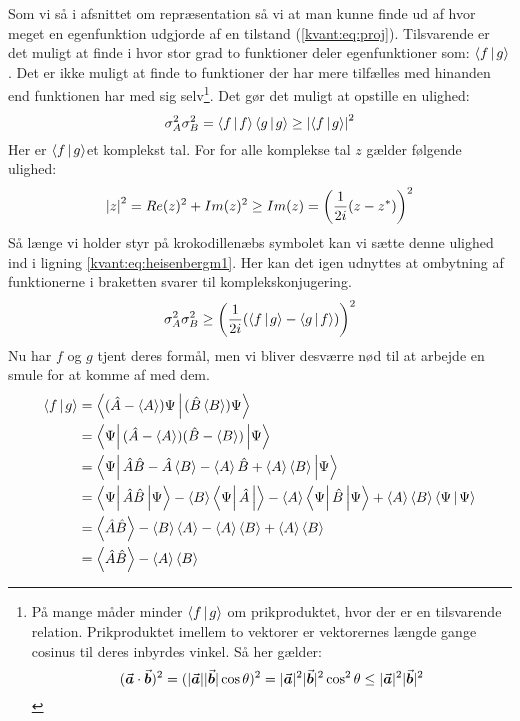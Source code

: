 \documentclass[../Kvantemekanik.tex]{subfiles}
\begin{document}
Som vi så i afsnittet om repræsentation så vi at man kunne finde ud af hvor meget en egenfunktion udgjorde af en tilstand (\eqref{kvant:eq:proj}).
Tilsvarende er det muligt at finde i hvor stor grad to funktioner deler egenfunktioner som: $\braket{f}{g}$. Det er ikke muligt at finde to funktioner der har mere tilfælles med hinanden end funktionen har med sig selv\footnote{
På mange måder minder $\braket{f}{g}$ om prikproduktet, hvor der er en tilsvarende relation. Prikproduktet imellem to vektorer er vektorernes længde gange cosinus til deres inbyrdes vinkel. Så her gælder:
$$
({\vec{\boldsymbol{a}}} \cdot {\vec{\boldsymbol{b}}})^2 = (|{{\vec{\boldsymbol{a}}}}||{{\vec{\boldsymbol{b}}}}|\cos\theta)^2 = |{\vec{\boldsymbol{a}}}|^2|{\vec{\boldsymbol{b}}}|^2\cos^2\theta\leq |{\vec{\boldsymbol{a}}}|^2|{\vec{\boldsymbol{b}}}|^2 
$$
}. Det gør det muligt at opstille en ulighed:
\begin{equation}
    \sigma_A^2\sigma_B^2 =\braket{f}{f}\braket{g}{g}\geq \abs{\braket{f}{g}}^2
    \label{kvant:eq:heisenbergm1}
\end{equation}
Her er $\braket{f}{g}$et komplekst tal. For for alle komplekse tal $z$ gælder følgende ulighed:
\begin{equation}
    \left| z \right|^2= Re(z)^2+Im(z)^2\geq Im(z) = \left(\frac{1}{2i}(z-z^*)\right)^2
\end{equation}
Så længe vi holder styr på krokodillenæbs symbolet kan vi sætte denne ulighed ind i ligning \eqref{kvant:eq:heisenbergm1}. Her kan det igen udnyttes at ombytning af funktionerne i braketten svarer til komplekskonjugering.
\begin{equation}
    \sigma_A^2\sigma_B^2\geq \left(\frac{1}{2i}(\braket{f}{g}-\braket{g}{f})\right)^2
    \label{kvant:eq:heisenbergm2}
\end{equation}
Nu har $f$ og $g$ tjent deres formål, men vi bliver desværre nød til at arbejde en smule for at komme af med dem.
\begin{align*}
    \braket{f}{g} &= \braket{(\op A-\expect A)\Psi}{(\op B \expect B)\Psi}\\
    &=\matrixel{\Psi}{(\op A - \expect A)(\op B - \expect B)}{\Psi}\\
    &= \matrixel{\Psi}{\op A\op B -\op A \expect B - \expect A \op B + \expect A\expect B}{\Psi}\\
    &=\matrixel{\Psi}{\op A\op B}{\Psi}-\expect B\matrixel{\Psi}{\op A}{}-\expect A\matrixel{\Psi}{\op B}{\Psi} + \expect A\expect B\braket{\Psi}{\Psi}\\
    &=\expect{\op A \op B}-\expect B \expect A - \expect A \expect B + \expect A\expect B\\
    &=\expect{\op A\op B}-\expect A\expect B
\end{align*}
\end{document}
